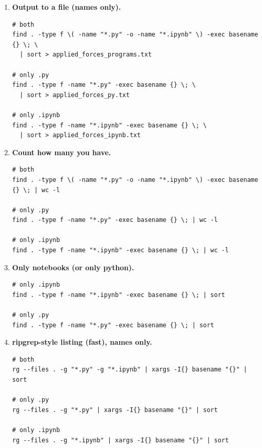 \documentclass[11pt]{article}
\begin{document}
\begin{enumerate}
\item \textbf{Output to a file (names only).}

\begin{verbatim}
# both
find . -type f \( -name "*.py" -o -name "*.ipynb" \) -exec basename {} \; \
  | sort > applied_forces_programs.txt

# only .py
find . -type f -name "*.py" -exec basename {} \; \
  | sort > applied_forces_py.txt

# only .ipynb
find . -type f -name "*.ipynb" -exec basename {} \; \
  | sort > applied_forces_ipynb.txt
\end{verbatim}

\item \textbf{Count how many you have.}

\begin{verbatim}
# both
find . -type f \( -name "*.py" -o -name "*.ipynb" \) -exec basename {} \; | wc -l

# only .py
find . -type f -name "*.py" -exec basename {} \; | wc -l

# only .ipynb
find . -type f -name "*.ipynb" -exec basename {} \; | wc -l
\end{verbatim}

\item \textbf{Only notebooks (or only python).}

\begin{verbatim}
# only .ipynb
find . -type f -name "*.ipynb" -exec basename {} \; | sort

# only .py
find . -type f -name "*.py" -exec basename {} \; | sort
\end{verbatim}

\item \textbf{ripgrep-style listing (fast), names only.}

\begin{verbatim}
# both
rg --files . -g "*.py" -g "*.ipynb" | xargs -I{} basename "{}" | sort

# only .py
rg --files . -g "*.py" | xargs -I{} basename "{}" | sort

# only .ipynb
rg --files . -g "*.ipynb" | xargs -I{} basename "{}" | sort
\end{verbatim}

\end{enumerate}
\end{document}
